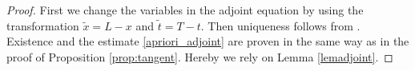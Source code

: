 \begin{proof}
{\color{red} First we change the variables in the adjoint equation by using the transformation $\tilde x=L-x$ and $\tilde t=T-t$. Then uniqueness follows from \cite[Proposition 15]{coron2003exact}. Existence and the estimate \eqref{apriori_adjoint} are proven in the same way as in the proof of Proposition \ref{prop:tangent}. Hereby we rely on Lemma \ref{lemadjoint}.}
\qquad\end{proof}







